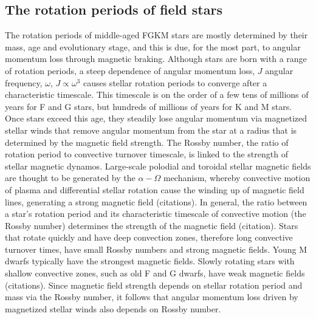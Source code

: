 \documentclass[useAMS, usenatbib, preprint, 12pt]{aastex}
\newcommand{\racomment}[1]{{\color{blue}#1}}
\begin{document}
\subsection{The rotation periods of field stars}
The rotation periods of middle-aged FGKM stars are mostly determined by their
mass, age and evolutionary stage, and this is due, for the most part, to
angular momentum loss through magnetic braking.
Although stars are born with a range of rotation periods, a steep dependence
of angular momentum loss, $J$ angular frequency, $\omega$, $J \propto
\omega^3$ causes stellar rotation periods to converge after a characteristic
timescale.
This timescale is on the order of a few tens of millions of years for F and G
stars, but hundreds of millions of years for K and M stars.
Once stars exceed this age, they steadily lose angular momentum via magnetized
stellar winds that remove angular momentum from the star at a radius that is
determined by the magnetic field strength.
The Rossby number, the ratio of rotation period to convective turnover
timescale, is linked to the strength of stellar magnetic dynamos.
Large-scale polodial and toroidal stellar magnetic fields are thought to be
generated by the $\alpha-\Omega$ mechanism, whereby convective motion of
plasma and differential stellar rotation cause the winding up of magnetic
field lines, generating a strong magnetic field \racomment{(citations)}.
In general, the ratio between a star's rotation period and its characteristic
timescale of convective motion (the Rossby number) determines the strength of
the magnetic field \racomment{(citation)}.
Stars that rotate quickly and have deep convection zones, therefore long
convective turnover times, have small Rossby numbers and strong magnetic
fields.
Young M dwarfs typically have the strongest magnetic fields.
Slowly rotating stars with shallow convective zones, such as old F and G
dwarfs, have weak magnetic fields \racomment{(citations)}.
Since magnetic field strength depends on stellar rotation period and mass via
the Rossby number, it follows that angular momentum loss driven by magnetized
stellar winds also depends on Rossby number.
\end{document}
